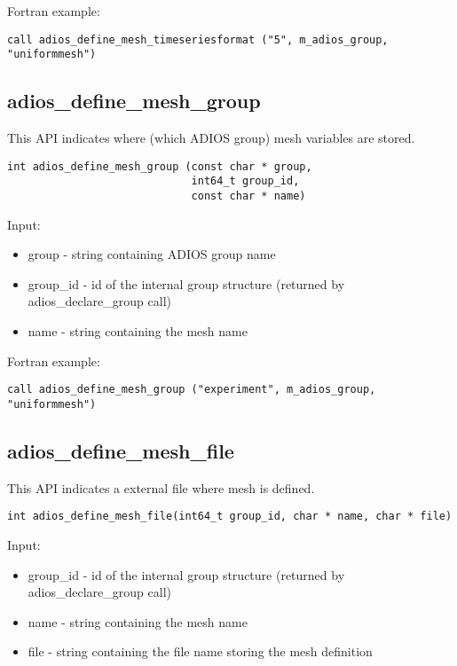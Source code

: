 Fortran example:
\begin{lstlisting}[alsolanguage=Fortran,caption={},label={}]
call adios_define_mesh_timeseriesformat ("5", m_adios_group, "uniformmesh")
\end{lstlisting}


\subsection{adios\_define\_mesh\_group}
This API indicates where (which ADIOS group) mesh variables are stored.

\begin{lstlisting}[alsolanguage=C,caption={},label={}]
int adios_define_mesh_group (const char * group, 
                             int64_t group_id, 
                             const char * name)
\end{lstlisting}

Input:
\begin{itemize}
\item group - string containing ADIOS group name
\item group\_id - id of the internal group structure (returned by adios\_declare\_group call)
\item name - string containing the mesh name
\end{itemize}

Fortran example:
\begin{lstlisting}[alsolanguage=Fortran,caption={},label={}]
call adios_define_mesh_group ("experiment", m_adios_group, "uniformmesh")
\end{lstlisting}


\subsection{adios\_define\_mesh\_file}
This API indicates a external file where mesh is defined.

\begin{lstlisting}[alsolanguage=C,caption={},label={}]
int adios_define_mesh_file(int64_t group_id, char * name, char * file)
\end{lstlisting}

Input:
\begin{itemize}
\item group\_id - id of the internal group structure (returned by adios\_declare\_group call)
\item name - string containing the mesh name
\item file - string containing the file name storing the mesh definition
\end{itemize}

